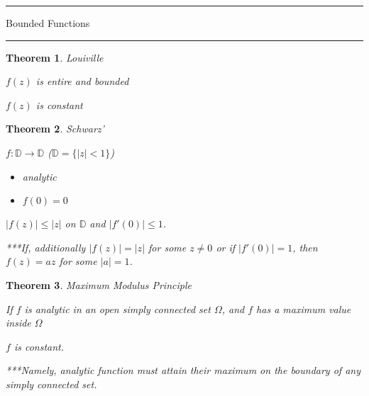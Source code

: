 \documentclass[12pt]{Qual}
\newtheorem{theorem}{Theorem}
\begin{document}
\begin{center}
\noindent\textcolor{blue!60!black}{\rule{15cm}{1mm}}
\Huge \faBug\faPuzzlePiece\faCoffee Bounded Functions \faCoffee\faPuzzlePiece\faBug
\vspace{-0.5cm}
\noindent\textcolor{blue!60!black}{\rule{15cm}{1mm}}
\end{center}
\vspace{0.25cm}
\begin{theorem}{\Large\textit{Louiville}}

 $f(z)$ is entire and bounded

 $f(z)$ is constant

\end{theorem}
\vspace{0.25cm}
\begin{theorem}{\Large\textit{Schwarz'}}

 $f:\mathbb{D}\to\mathbb{D}$ ($\mathbb{D}=\{|z|<1\}$)
\vspace{-0.25cm}
\begin{itemize}[leftmargin=2.5cm]
\setlength\itemsep{-0.1em}
\renewcommand\labelitemi{\faPuzzlePiece}
    \item analytic
    \item $f(0)=0$
\end{itemize}

 $|f(z)|\le|z|$ on $\mathbb{D}$ and $|f'(0)|\le 1$.

\begin{mybox}
***If, additionally $|f(z)|=|z|$ for some $z\not=0$ \textit{or} if $|f'(0)|=1$, then $f(z)=az$ for some $|a|=1$.
\end{mybox}

\end{theorem}
\vspace{0.25cm}
\begin{theorem}{\Large\textit{Maximum Modulus Principle}}

 \begin{minipage}{0.85\textwidth}
\vspace{0.45cm}
If $f$ is analytic in an open simply connected set $\Omega$, and $f$ has a maximum value inside $\Omega$
\end{minipage}

 $f$ is constant.

***Namely, analytic function must attain their maximum on the boundary of any simply connected set.

\end{theorem}
\end{document}
